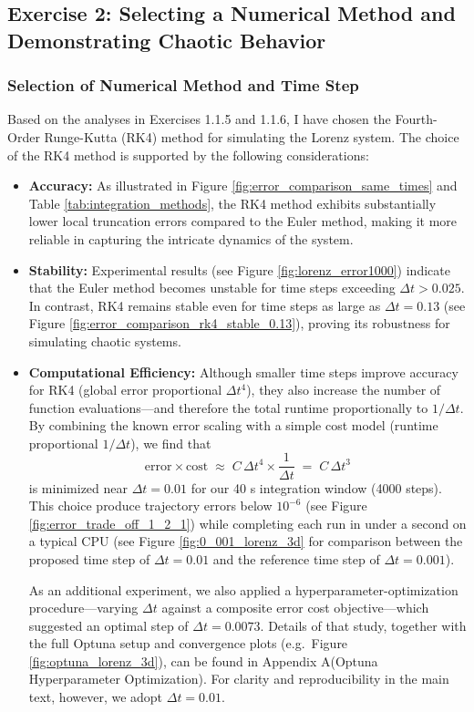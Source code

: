 \subsection{Exercise 2: Selecting a Numerical Method and Demonstrating Chaotic Behavior}

\subsubsection{Selection of Numerical Method and Time Step}
Based on the analyses in Exercises 1.1.5 and 1.1.6, I have chosen the Fourth-Order Runge-Kutta (RK4) method for simulating the Lorenz system.
The choice of the RK4 method is supported by the following considerations:

\begin{itemize}
    \item \textbf{Accuracy:} As illustrated in Figure \ref{fig:error_comparison_same_times} and Table \ref{tab:integration_methods}, the RK4 method exhibits substantially lower local truncation errors compared to the Euler method, making it more reliable in capturing the intricate dynamics of the system.
    \item \textbf{Stability:} Experimental results (see Figure \ref{fig:lorenz_error1000}) indicate that the Euler method becomes unstable for time steps exceeding \(\Delta t > 0.025\). In contrast, RK4 remains stable even for time steps as large as \(\Delta t = 0.13\) (see Figure \ref{fig:error_comparison_rk4_stable_0.13}), proving its robustness for simulating chaotic systems.
    \item \textbf{Computational Efficiency:} Although smaller time steps improve accuracy for RK4 (global error proportional \(\Delta t^4\)), they also increase the number of function evaluations—and therefore the total runtime proportionally to \(1/\Delta t\).  By combining the known error scaling with a simple cost model (runtime proportional \(1/\Delta t\)), we find that
    \[
        \text{error} \times \text{cost} \;\approx\; C\,\Delta t^4 \times \frac{1}{\Delta t}
        \;=\; C\,\Delta t^3
    \]
    is minimized near \(\Delta t=0.01\) for our 40 s integration window (4000 steps).  This choice produce trajectory errors below \(10^{-6}\) (see Figure \ref{fig:error_trade_off_1_2_1}) while completing each run in under a second on a typical CPU (see Figure \ref{fig:0_001_lorenz_3d} for comparison between the proposed time step of \(\Delta t = 0.01\) and the reference time step of \(\Delta t = 0.001\)).
    
    As an additional experiment, we also applied a hyperparameter-optimization procedure—varying \(\Delta t\) against a composite error cost objective—which suggested an optimal step of \(\Delta t = 0.0073\).  Details of that study, together with the full Optuna setup and convergence plots (e.g.\ Figure \ref{fig:optuna_lorenz_3d}), can be found in Appendix A(Optuna Hyperparameter Optimization).  For clarity and reproducibility in the main text, however, we adopt \(\Delta t = 0.01\).
      
\end{itemize}


